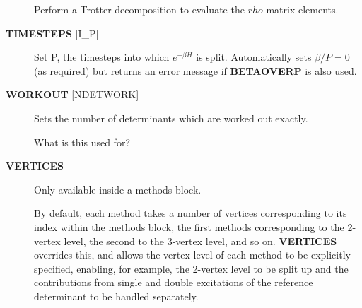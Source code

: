 \documentclass[openany,a4paper,10pt]{manual}
\begin{document}
\begin{description}
Perform a Trotter decomposition to evaluate the $rho$ matrix elements.

\item[\textbf{TIMESTEPS} {[}I\_P{]}]
Set P, the timesteps into which $e^{-\beta H}$ is split.  Automatically
sets $\beta/P=0$ (as required) but returns an error message if \textbf{BETAOVERP}
is also used.

\item[\textbf{WORKOUT} {[}NDETWORK{]}]
Sets the number of determinants which are worked out exactly.

\begin{notice}[note]
What is this used for?
\end{notice}

\item[\textbf{VERTICES}]
Only available inside a methods block.

By default, each method takes a
number of vertices corresponding to its index within the methods
block, the first methods corresponding to the 2-vertex level, the
second to the 3-vertex level, and so on.  \textbf{VERTICES} overrides this,
and allows the vertex level of each method to be explicitly specified,
enabling, for example, the 2-vertex level to be split up and the
contributions from single and double excitations of the reference
determinant to be handled separately.

\end{description}
\end{document}

